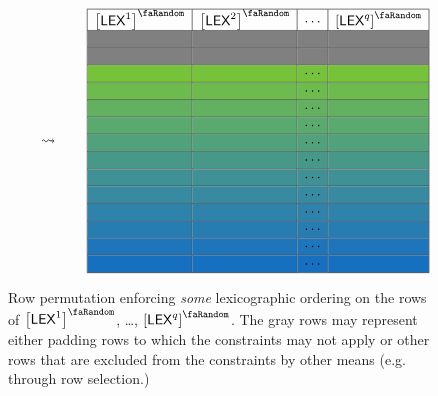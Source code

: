 \begin{figure}
\[\begin{array}{|c|c|c|c|}
\end{array}
\qquad\rightsquigarrow\qquad
\begin{array}{|c|c|c|c|}
\hline
\order{\lex^{1}} & \order{\lex^{2}} & \cdots & \order{\lex^{q}} \\ \hline
\cellcolor{\lightgray} & \cellcolor{\lightgray} & \cellcolor{\lightgray} & \cellcolor{\lightgray} \\ \hline
\cellcolor{\lightgray} & \cellcolor{\lightgray} & \cellcolor{\lightgray} & \cellcolor{\lightgray} \\ \hline
\cellcolor{\colL!8!\colS}   & \cellcolor{\colL!8!\colS}   & \cellcolor{\colL!8!\colS}  \cdots  & \cellcolor{\colL!8!\colS}   \\ \hline
\cellcolor{\colL!16!\colS}  & \cellcolor{\colL!16!\colS}  & \cellcolor{\colL!16!\colS} \cdots  & \cellcolor{\colL!16!\colS}  \\ \hline
\cellcolor{\colL!25!\colS}  & \cellcolor{\colL!25!\colS}  & \cellcolor{\colL!25!\colS} \cdots  & \cellcolor{\colL!25!\colS}  \\ \hline
\cellcolor{\colL!33!\colS}  & \cellcolor{\colL!33!\colS}  & \cellcolor{\colL!33!\colS} \cdots  & \cellcolor{\colL!33!\colS}  \\ \hline
\cellcolor{\colL!41!\colS}  & \cellcolor{\colL!41!\colS}  & \cellcolor{\colL!41!\colS} \cdots  & \cellcolor{\colL!41!\colS}  \\ \hline
\cellcolor{\colL!50!\colS}  & \cellcolor{\colL!50!\colS}  & \cellcolor{\colL!50!\colS} \cdots  & \cellcolor{\colL!50!\colS}  \\ \hline
\cellcolor{\colL!58!\colS}  & \cellcolor{\colL!58!\colS}  & \cellcolor{\colL!58!\colS} \cdots  & \cellcolor{\colL!58!\colS}  \\ \hline
\cellcolor{\colL!66!\colS}  & \cellcolor{\colL!66!\colS}  & \cellcolor{\colL!66!\colS} \cdots  & \cellcolor{\colL!66!\colS}  \\ \hline
\cellcolor{\colL!75!\colS}  & \cellcolor{\colL!75!\colS}  & \cellcolor{\colL!75!\colS} \cdots  & \cellcolor{\colL!75!\colS}  \\ \hline
\cellcolor{\colL!83!\colS}  & \cellcolor{\colL!83!\colS}  & \cellcolor{\colL!83!\colS} \cdots  & \cellcolor{\colL!83!\colS}  \\ \hline
\cellcolor{\colL!91!\colS}  & \cellcolor{\colL!91!\colS}  & \cellcolor{\colL!91!\colS} \cdots  & \cellcolor{\colL!91!\colS}  \\ \hline
\cellcolor{\colL!100!\colS} & \cellcolor{\colL!100!\colS} & \cellcolor{\colL!100!\colS} \cdots & \cellcolor{\colL!100!\colS} \\ \hline
\end{array}
\]
	\caption{Row permutation enforcing \emph{some} lexicographic ordering on the rows of $\order{\lex^{1}}$, \dots, $\order{\lex^{q}}$. The gray rows may represent either padding rows to which the constraints may not apply or other rows that are excluded from the constraints by other means (e.g. through row selection.)}
\end{figure}
